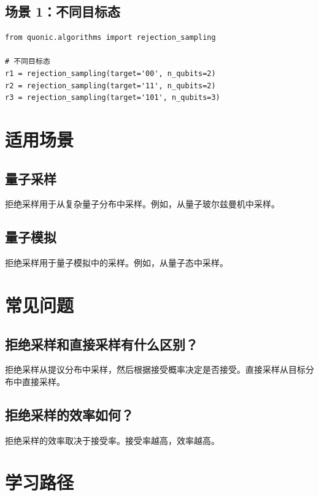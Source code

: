 \documentclass[12pt,a4paper]{article}
\begin{document}
\subsection{场景 1：不同目标态}

\begin{verbatim}
from quonic.algorithms import rejection_sampling

# 不同目标态
r1 = rejection_sampling(target='00', n_qubits=2)
r2 = rejection_sampling(target='11', n_qubits=2)
r3 = rejection_sampling(target='101', n_qubits=3)
\end{verbatim}

\section{适用场景}

\subsection{量子采样}

拒绝采样用于从复杂量子分布中采样。例如，从量子玻尔兹曼机中采样。

\subsection{量子模拟}

拒绝采样用于量子模拟中的采样。例如，从量子态中采样。

\section{常见问题}

\subsection{拒绝采样和直接采样有什么区别？}

拒绝采样从提议分布中采样，然后根据接受概率决定是否接受。直接采样从目标分布中直接采样。

\subsection{拒绝采样的效率如何？}

拒绝采样的效率取决于接受率。接受率越高，效率越高。

\section{学习路径}
\end{document}
